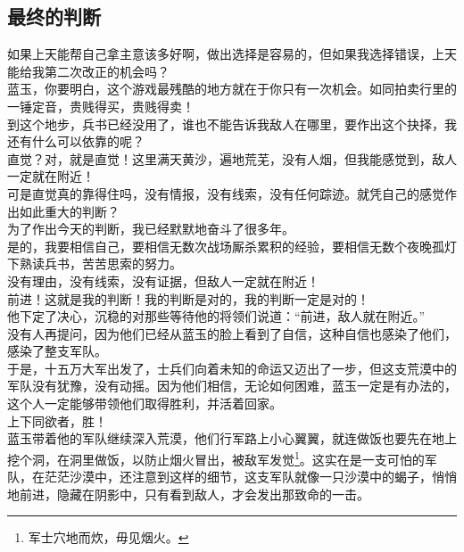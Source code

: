 \begin{multicols}{\theparacolNo}
\subsection{最终的判断}
如果上天能帮自己拿主意该多好啊，做出选择是容易的，但如果我选择错误，上天能给我第二次改正的机会吗？\\

蓝玉，你要明白，这个游戏最残酷的地方就在于你只有一次机会。如同拍卖行里的一锤定音，贵贱得买，贵贱得卖！\\

到这个地步，兵书已经没用了，谁也不能告诉我敌人在哪里，要作出这个抉择，我还有什么可以依靠的呢？\\

直觉？对，就是直觉！这里满天黄沙，遍地荒芜，没有人烟，但我能感觉到，敌人一定就在附近！\\

可是直觉真的靠得住吗，没有情报，没有线索，没有任何踪迹。就凭自己的感觉作出如此重大的判断？\\

为了作出今天的判断，我已经默默地奋斗了很多年。\\

是的，我要相信自己，要相信无数次战场厮杀累积的经验，要相信无数个夜晚孤灯下熟读兵书，苦苦思索的努力。\\

没有理由，没有线索，没有证据，但敌人一定就在附近！\\

前进！这就是我的判断！我的判断是对的，我的判断一定是对的！\\

他下定了决心，沉稳的对那些等待他的将领们说道：“前进，敌人就在附近。”\\

没有人再提问，因为他们已经从蓝玉的脸上看到了自信，这种自信也感染了他们，感染了整支军队。\\

于是，十五万大军出发了，士兵们向着未知的命运又迈出了一步，但这支荒漠中的军队没有犹豫，没有动摇。因为他们相信，无论如何困难，蓝玉一定是有办法的，这个人一定能够带领他们取得胜利，并活着回家。\\

上下同欲者，胜！\\

蓝玉带着他的军队继续深入荒漠，他们行军路上小心翼翼，就连做饭也要先在地上挖个洞，在洞里做饭，以防止烟火冒出，被敌军发觉\footnote{军士穴地而炊，毋见烟火。}。这实在是一支可怕的军队，在茫茫沙漠中，还注意到这样的细节，这支军队就像一只沙漠中的蝎子，悄悄地前进，隐藏在阴影中，只有看到敌人，才会发出那致命的一击。\\


\end{multicols}
